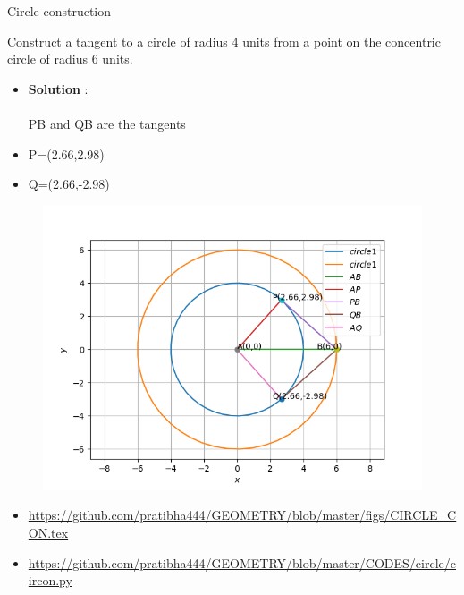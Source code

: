 \begin{frame}{Circle construction}

 Construct a tangent to a circle of radius 4 units
from a point on the concentric circle of radius
6 units.\\
\begin{itemize}
\item\textbf{Solution} :\\
\\  PB and QB are the tangents 
\item P=(2.66,2.98)\\
\item Q=(2.66,-2.98)\\
\end{itemize}

\seti
\end{frame}
\begin{frame}
\begin{figure}
\includegraphics[scale=.4]{./CODES/circle/CIR_CON.png}
\end{figure}
\begin{itemize}
\item \url{https://github.com/pratibha444/GEOMETRY/blob/master/figs/CIRCLE_CON.tex}  \\
\item \url{https://github.com/pratibha444/GEOMETRY/blob/master/CODES/circle/circon.py}
\end{itemize}
\end{frame}